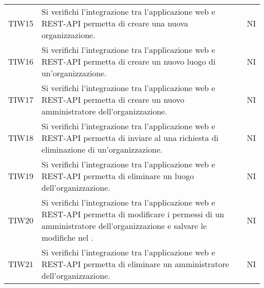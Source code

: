 {\begin{longtable}{ c C{13cm} C{1cm}}
TIW15 & Si verifichi l’integrazione tra l’applicazione web e REST-API permetta di creare una nuova organizzazione.& NI \\
TIW16 & Si verifichi l’integrazione tra l’applicazione web e REST-API permetta di creare un nuovo luogo di un’organizzazione.& NI \\
TIW17 & Si verifichi l’integrazione tra l’applicazione web e REST-API permetta di creare un nuovo amministratore dell’organizzazione.& NI \\
TIW18 & Si verifichi l’integrazione tra l’applicazione web e REST-API permetta di inviare al  una richiesta di eliminazione di un’organizzazione.& NI \\
TIW19 & Si verifichi l’integrazione tra l’applicazione web e REST-API permetta di eliminare un luogo dell’organizzazione.& NI \\
TIW20 & Si verifichi l’integrazione tra l’applicazione web e REST-API permetta di modificare i permessi di un amministratore dell’organizzazione e salvare le modifiche nel .& NI \\
TIW21 & Si verifichi l’integrazione tra l’applicazione web e REST-API permetta di eliminare un amministratore dell’organizzazione.& NI \\




\end{longtable}
}